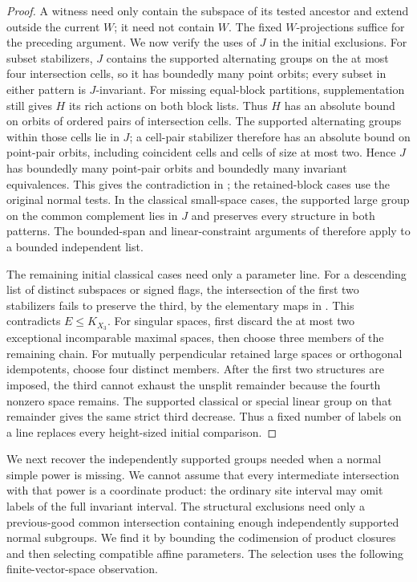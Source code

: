 \begin{proof}
A witness need only contain the subspace of its tested ancestor
and extend outside the current $W$; it need not contain $W$.
The fixed $W$-projections suffice for the preceding argument.
We now verify the uses of $J$ in the initial exclusions.  For subset
stabilizers, $J$ contains the supported alternating groups on the at
most four intersection cells, so it has boundedly many point orbits;
every subset in either pattern is $J$-invariant.  For missing
equal-block partitions, supplementation still gives $H$ its rich
actions on both block lists.  Thus $H$ has an absolute bound on
orbits of ordered pairs of intersection cells.  The supported
alternating groups within those cells lie in $J$; a cell-pair
stabilizer therefore has an absolute bound on point-pair orbits,
including coincident cells and cells of size at most two.  Hence $J$
has boundedly many point-pair orbits and boundedly many invariant
equivalences.  This gives the contradiction in
; the retained-block cases use the
original normal tests.  In the classical small-space cases, the
supported large group on the common complement lies in $J$ and
preserves every structure in both patterns.  The bounded-span and
linear-constraint arguments of
 therefore apply to a
bounded independent list.

The remaining initial classical cases need only a parameter line.
For a descending list of distinct subspaces or signed flags, the
intersection of the first two stabilizers fails to preserve the
third, by the elementary maps in .  This
contradicts $E\le K_{X_3}$.  For singular spaces, first discard the
at most two exceptional incomparable maximal spaces, then choose
three members of the remaining chain.  For mutually perpendicular
retained large spaces or orthogonal idempotents, choose four distinct
members.  After the first two structures are imposed, the third
cannot exhaust the unsplit remainder because the fourth nonzero
space remains.  The supported classical or special linear group on
that remainder gives the same strict third decrease.  Thus a fixed
number of labels on a line replaces every height-sized initial
comparison.
\end{proof}

We next recover the independently supported groups needed when a
normal simple power is missing.  We cannot assume that every
intermediate intersection with that power is a coordinate product:
the ordinary site interval may omit labels of the full invariant
interval.  The structural exclusions need only a previous-good
common intersection containing enough independently supported normal
subgroups.  We find it by bounding the codimension of product closures
and then selecting compatible affine parameters.  The selection uses
the following finite-vector-space observation.


